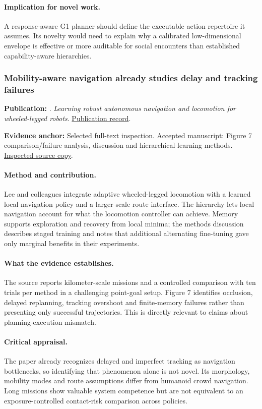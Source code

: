 \paragraph{Implication for novel work.} A response-aware G1 planner should define the executable action repertoire it assumes. Its novelty would need to explain why a calibrated low-dimensional envelope is effective or more auditable for social encounters than established capability-aware hierarchies.

\subsubsection{Mobility-aware navigation already studies delay and tracking failures}\label{paper:wheeledleg}
\textbf{Publication:} \citet{wheeledleg}. \emph{Learning robust autonomous navigation and locomotion for wheeled-legged robots}. \href{https://doi.org/10.1126/scirobotics.adi9641}{Publication record}.

\textbf{Evidence anchor:} Selected full-text inspection. Accepted manuscript: Figure 7 comparison/failure analysis, discussion and hierarchical-learning methods. \href{https://arxiv.org/pdf/2405.01792}{Inspected source copy}.

\paragraph{Method and contribution.} Lee and colleagues integrate adaptive wheeled-legged locomotion with a learned local navigation policy and a larger-scale route interface. The hierarchy lets local navigation account for what the locomotion controller can achieve. Memory supports exploration and recovery from local minima; the methods discussion describes staged training and notes that additional alternating fine-tuning gave only marginal benefits in their experiments.

\paragraph{What the evidence establishes.} The source reports kilometer-scale missions and a controlled comparison with ten trials per method in a challenging point-goal setup. Figure 7 identifies occlusion, delayed replanning, tracking overshoot and finite-memory failures rather than presenting only successful trajectories. This is directly relevant to claims about planning-execution mismatch.

\paragraph{Critical appraisal.} The paper already recognizes delayed and imperfect tracking as navigation bottlenecks, so identifying that phenomenon alone is not novel. Its morphology, mobility modes and route assumptions differ from humanoid crowd navigation. Long missions show valuable system competence but are not equivalent to an exposure-controlled contact-risk comparison across policies.

